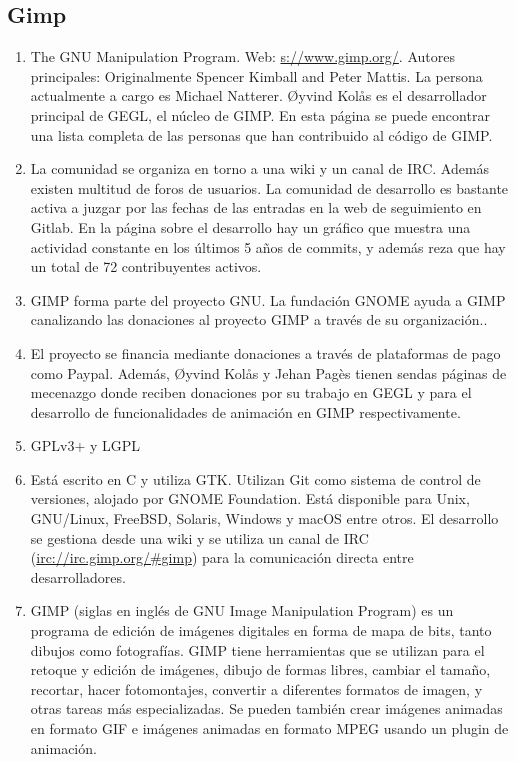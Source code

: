 \subsection{Gimp}
\begin{enumerate}
    \item The GNU Manipulation Program. Web: \url{s://www.gimp.org/}. Autores principales: Originalmente Spencer Kimball and Peter Mattis. La persona actualmente a cargo es Michael Natterer. Øyvind Kolås es el desarrollador principal de GEGL, el núcleo de GIMP. En esta página se puede encontrar una lista completa de las personas que han contribuido al código de GIMP.
    \item La comunidad se organiza en torno a una wiki y un canal de IRC. Además existen multitud de foros de usuarios. La comunidad de desarrollo es bastante activa a juzgar por las fechas de las entradas en la web de seguimiento en Gitlab. En la página sobre el desarrollo hay un gráfico que muestra una actividad constante en los últimos 5 años de commits, y además reza que hay un total de 72 contribuyentes activos.
    \item GIMP forma parte del proyecto GNU. La fundación GNOME ayuda a GIMP canalizando las donaciones al proyecto GIMP a través de su organización..
    \item El proyecto se financia mediante donaciones a través de plataformas de pago como Paypal. Además, Øyvind Kolås y Jehan Pagès tienen sendas páginas de mecenazgo donde reciben donaciones por su trabajo en GEGL y para el desarrollo de funcionalidades de animación en GIMP respectivamente.
    \item GPLv3+ y LGPL
    \item Está escrito en C y utiliza GTK. Utilizan Git como sistema de control de versiones, alojado por GNOME Foundation. Está disponible para Unix, GNU/Linux, FreeBSD, Solaris, Windows y macOS entre otros. El desarrollo se gestiona desde una wiki y se utiliza un canal de IRC (\url{irc://irc.gimp.org/#gimp}) para la comunicación directa entre desarrolladores.
    \item GIMP (siglas en inglés de GNU Image Manipulation Program) es un programa de edición de imágenes digitales en forma de mapa de bits, tanto dibujos como fotografías. GIMP tiene herramientas que se utilizan para el retoque y edición de imágenes, dibujo de formas libres, cambiar el tamaño, recortar, hacer fotomontajes, convertir a diferentes formatos de imagen, y otras tareas más especializadas. Se pueden también crear imágenes animadas en formato GIF e imágenes animadas en formato MPEG usando un plugin de animación.
\end{enumerate}



